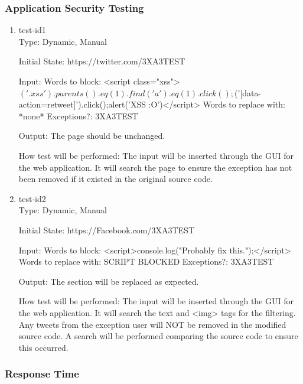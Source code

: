 \documentclass[12pt, titlepage]{article}
\begin{document}
\subsubsection{Application Security Testing}
\begin{enumerate}
\item{test-id1\\}
Type: Dynamic, Manual
					
Initial State: https://twitter.com/3XA3TEST
					
Input: Words to block: <script class="xss">$('.xss').parents().eq(1).find('a').eq(1).click();$('[data-action=retweet]').click();alert('XSS :O')</script>
Words to replace with: *none*
Exceptions?: 3XA3TEST
					
Output: The page should be unchanged.
					
How test will be performed: The input will be inserted through the GUI for the web application. It will search the page to ensure the exception has not been removed if it existed in the original source code.
					
\item{test-id2\\}
Type: Dynamic, Manual
					
Initial State: https://Facebook.com/3XA3TEST
					
Input:  Words to block: <script>console.log("Probably fix this.");</script>
Words to replace with: SCRIPT BLOCKED
Exceptions?: 3XA3TEST
					
Output: The section will be replaced as expected. 

How test will be performed: The input will be inserted through the GUI for the web application. It will search the text and <img> tags for the filtering. Any tweets from the exception user will NOT be removed in the modified source code. A search will be performed comparing the source code to ensure this occurred.
\end{enumerate}
\subsubsection{Response Time}
		
\end{document}

